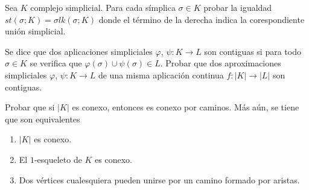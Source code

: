 \documentclass[twoside]{article}
\begin{document}
\newpage

\begin{ejercicio}{1.3}
Sea $K$ complejo simplicial.
Para cada símplica $σ \in K$ probar la igualdad $st(σ;K) = σlk(σ;K)$ donde el término de la derecha indica la corespondiente unión simplicial.
\end{ejercicio}
\begin{solucion}
\end{solucion}

\newpage

\begin{ejercicio}{1.4}
Se dice que dos aplicaciones simpliciales $φ$, $ψ : K \to L$ son contiguas si para todo $σ \in K$ se verifica que $φ(σ) \cup ψ(σ) \in L$.
Probar que dos aproximaciones simpliciales $φ$, $ψ : K \to L$ de una misma aplicación continua $f : |K| \to |L|$ son contiguas.
\end{ejercicio}
\begin{solucion}
\end{solucion}

\newpage

\begin{ejercicio}{1.5}
Probar que si $|K|$ es conexo, entonces es conexo por caminos.
Más aún, se tiene que son equivalentes
\begin{enumerate}
\item $|K|$ es conexo.
\item El $1$-esqueleto de $K$ es conexo.
\item Dos vértices cualesquiera pueden unirse por un camino formado por aristas.
\end{enumerate}
\end{ejercicio}
\begin{solucion}
\end{solucion}

\newpage
\end{document}
